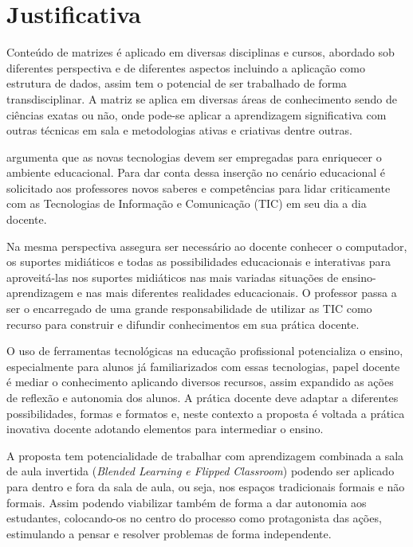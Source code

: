             
\section{Justificativa}
\label{sec:justificativa}

Conteúdo de matrizes é aplicado em diversas disciplinas e cursos, abordado sob diferentes perspectiva e de diferentes aspectos incluindo a aplicação como estrutura de dados, assim tem o potencial de ser trabalhado de forma transdisciplinar. A matriz se aplica em diversas áreas de conhecimento sendo de ciências exatas ou não, onde pode-se aplicar a aprendizagem significativa com outras técnicas em sala e metodologias ativas e criativas dentre outras.

 argumenta que as novas tecnologias devem ser empregadas para enriquecer o ambiente educacional. Para dar conta dessa inserção no cenário educacional é solicitado aos professores novos saberes e competências para lidar criticamente com as Tecnologias de Informação e Comunicação (TIC) em seu dia a dia docente.

Na mesma perspectiva  assegura ser necessário ao docente conhecer o computador, os suportes midiáticos e todas as possibilidades educacionais e interativas para aproveitá-las nos suportes midiáticos nas mais variadas situações de ensino-aprendizagem e nas mais diferentes realidades educacionais. O professor passa a ser o encarregado de uma grande responsabilidade de utilizar as TIC como recurso para construir e difundir conhecimentos em sua prática docente.

O uso de ferramentas tecnológicas na educação profissional potencializa o ensino, especialmente para alunos já familiarizados com essas tecnologias, papel docente é mediar o conhecimento aplicando diversos recursos, assim expandido as ações de reflexão e autonomia dos alunos. A prática docente deve adaptar a diferentes possibilidades, formas e formatos e, neste contexto a proposta é voltada a prática inovativa docente adotando elementos para intermediar o ensino.

A proposta tem potencialidade de trabalhar com aprendizagem combinada a sala de aula invertida (\textit{Blended Learning e Flipped Classroom}) podendo ser aplicado para dentro e fora da sala de aula, ou seja, nos espaços tradicionais formais e não formais. Assim podendo viabilizar também de forma a dar autonomia aos estudantes, colocando-os no centro do processo como protagonista das ações, estimulando a pensar e resolver problemas de forma independente.

